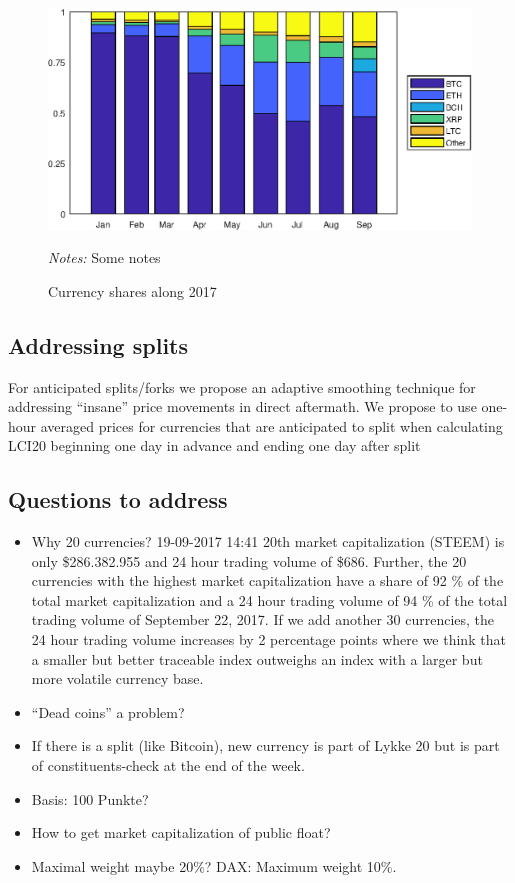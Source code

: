 \documentclass[11pt]{article}
\newcommand\fnotes[1]{\captionsetup{font=scriptsize}\caption*{\textsl{Notes:} #1}}
\begin{document}
\begin{figure}%
    \centering%
    \caption{Currency shares along 2017}\label{f:curshares}%
    \includegraphics[width=\textwidth]{figs/currency_shares.eps}%
    \fnotes{Some notes}
\end{figure}

\subsection{Addressing splits}\label{subseq:split_smoothing}
For anticipated splits/forks we propose an adaptive smoothing technique for addressing ``insane'' price movements in direct aftermath.
We propose to use one-hour averaged prices for currencies that are anticipated to split when calculating LCI20 beginning one day in advance and ending one day after split


\subsection{Questions to address}
\begin{itemize}
  \item Why 20 currencies? 19-09-2017 14:41 20th market capitalization (STEEM) is only \$286.382.955 and 24 hour trading volume of \$686. Further, the 20 currencies with the highest market capitalization have a share of 92 \% of the total market capitalization and a 24 hour trading volume of 94 \% of the total trading volume of September 22, 2017. If we add another 30 currencies, the 24 hour trading volume increases by 2 percentage points where we think that a smaller but better traceable index outweighs an index with a larger but more volatile currency base.
  \item ``Dead coins'' a problem?
  \item If there is a split (like Bitcoin), new currency is part of Lykke 20 but is part of constituents-check at the end of the week.
  \item Basis: 100 Punkte?
  \item How to get market capitalization of public float?
  \item Maximal weight maybe 20\%? DAX: Maximum weight 10\%.
\end{itemize}
\end{document}
